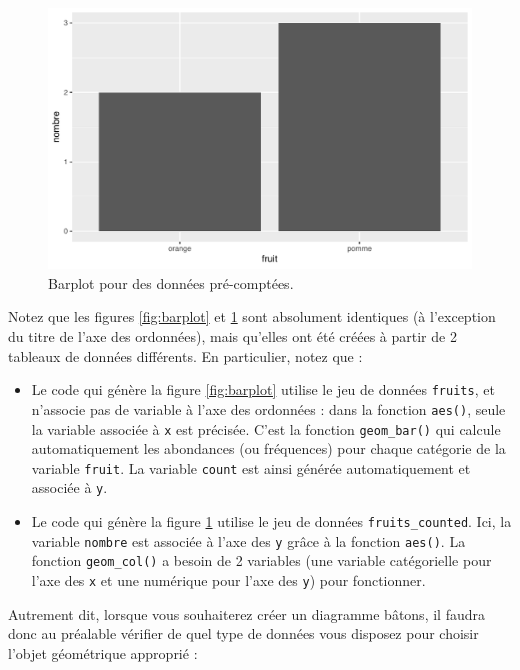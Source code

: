 \documentclass[a4paperpaper,]{article}
\providecommand{\tightlist}{%
  \setlength{\itemsep}{0pt}\setlength{\parskip}{0pt}}
\begin{document}
\begin{figure}[htpb]

{\centering \includegraphics[width=0.9\linewidth]{figure/barplotcol-1} 

}

\caption{Barplot pour des données pré-comptées.}\label{fig:barplotcol}
\end{figure}

Notez que les figures \ref{fig:barplot} et \ref{fig:barplotcol} sont absolument identiques (à l'exception du titre de l'axe des ordonnées), mais qu'elles ont été créées à partir de 2 tableaux de données différents. En particulier, notez que :

\begin{itemize}
\tightlist
\item
  Le code qui génère la figure \ref{fig:barplot} utilise le jeu de données \texttt{fruits}, et n'associe pas de variable à l'axe des ordonnées : dans la fonction \texttt{aes()}, seule la variable associée à \texttt{x} est précisée. C'est la fonction \texttt{geom\_bar()} qui calcule automatiquement les abondances (ou fréquences) pour chaque catégorie de la variable \texttt{fruit}. La variable \texttt{count} est ainsi générée automatiquement et associée à \texttt{y}.
\item
  Le code qui génère la figure \ref{fig:barplotcol} utilise le jeu de données \texttt{fruits\_counted}. Ici, la variable \texttt{nombre} est associée à l'axe des \texttt{y} grâce à la fonction \texttt{aes()}. La fonction \texttt{geom\_col()} a besoin de 2 variables (une variable catégorielle pour l'axe des \texttt{x} et une numérique pour l'axe des \texttt{y}) pour fonctionner.
\end{itemize}

Autrement dit, lorsque vous souhaiterez créer un diagramme bâtons, il faudra donc au préalable vérifier de quel type de données vous disposez pour choisir l'objet géométrique approprié :
\end{document}
